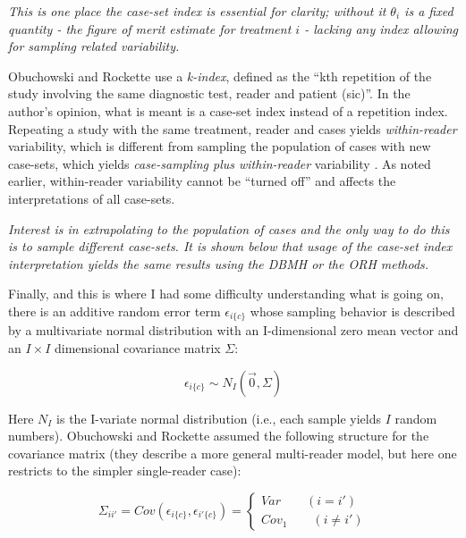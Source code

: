 \documentclass[
]{book}
\begin{document}
\emph{This is one place the case-set index is essential for clarity; without it \(\theta_i\) is a fixed quantity - the figure of merit estimate for treatment \(i\) - lacking any index allowing for sampling related variability.}

Obuchowski and Rockette use a \emph{k-index}, defined as the ``kth repetition of the study involving the same diagnostic test, reader and patient (sic)''. In the author's opinion, what is meant is a case-set index instead of a repetition index. Repeating a study with the same treatment, reader and cases yields \emph{within-reader} variability, which is different from sampling the population of cases with new case-sets, which yields \emph{case-sampling plus within-reader} variability \citep{RN412}. As noted earlier, within-reader variability cannot be ``turned off'' and affects the interpretations of all case-sets.

\emph{Interest is in extrapolating to the population of cases and the only way to do this is to sample different case-sets. It is shown below that usage of the case-set index interpretation yields the same results using the DBMH or the ORH methods.}

Finally, and this is where I had some difficulty understanding what is going on, there is an additive random error term \(\epsilon_{i\{c\}}\) whose sampling behavior is described by a multivariate normal distribution with an I-dimensional zero mean vector and an \(I \times I\) dimensional covariance matrix \(\Sigma\):

\begin{equation}
\epsilon_{i\{c\}} \sim N_I\left ( \vec{0} ,  \Sigma\right )
\label{eq:DefinitionEpsilon}
\end{equation}

Here \(N_I\) is the I-variate normal distribution (i.e., each sample yields \(I\) random numbers). Obuchowski and Rockette assumed the following structure for the covariance matrix (they describe a more general multi-reader model, but here one restricts to the simpler single-reader case):

\begin{equation}
\Sigma_{ii'}=Cov\left ( \epsilon_{i\{c\}}, \epsilon_{i'\{c\}} \right )=\left\{\begin{matrix}
Var \qquad (i=i')\\ 
Cov_1 \qquad (i\neq i')
\end{matrix}\right.
\label{eq:DefinitionSigma}
\end{equation}
\end{document}
